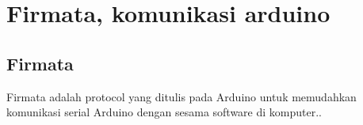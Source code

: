 
\section{Firmata, komunikasi arduino}

	\subsection{Firmata}
	Firmata adalah protocol yang ditulis pada Arduino untuk memudahkan komunikasi serial Arduino dengan sesama software di komputer..
	